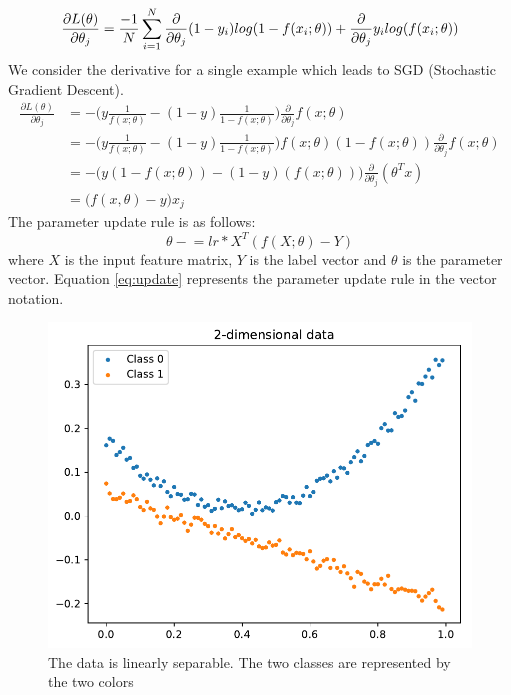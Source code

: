 \documentclass{article}
\begin{document}
\begin{equation}
        \frac{\partial L(\theta)}{\partial \theta_{j}} = \frac{-1}{N}\sum_{i=1}^{N} \frac{\partial }{\partial \theta_j}(1-y_i )log(1-f(x_i;\theta)) + \frac{\partial }{\partial \theta_j}y_i log(f(x_i;\theta)) \\
\end{equation}
We consider the derivative for a single example which leads to SGD (Stochastic Gradient Descent).
\begin{equation} \label{eq:deriv}
\begin{split}
    \frac{\partial L(\theta)}{\partial \theta_{j}} &= -\Big(y \frac{1}{f(x;\theta)} - (1-y) \frac{1}{1-f(x;\theta)}\Big) \frac {\partial}{\partial \theta_j}f(x;\theta)\\
    &= -\Big(y \frac{1}{f(x;\theta)} - (1-y) \frac{1}{1-f(x;\theta)}\Big)f(x;\theta)(1-f(x;\theta)) \frac {\partial}{\partial \theta_j}f(x;\theta)\\
    &= -\Big(y(1- f(x;\theta)) - (1-y) (f(x;\theta))\Big)\frac{\partial}{\partial \theta_j}(\theta^{T}x)\\
    &= \big(f(x,\theta)-y\big)x_j
\end{split}
\end{equation}
The parameter update rule is as follows:
\begin{equation}
\label{eq:update}
    \theta \mathrel{-}= lr * X^{T}(f(X;\theta)-Y)
\end{equation}
where $X$ is the input feature matrix, $Y$ is the label vector and $\theta$ is the parameter vector. Equation \ref{eq:update} represents the parameter update rule in the vector notation. 
\begin{figure}[H]
    \centering
    \includegraphics[trim = 0cm 0cm 0cm 0cm,scale = 0.75]{input_data.pdf}
    \caption{The data is linearly separable. The two classes are represented by the two colors}
 \label{fig:input_dta}
 \end{figure}
 
\end{document}
